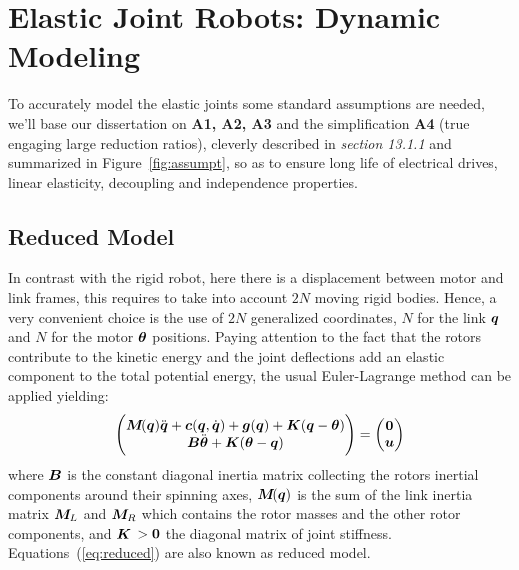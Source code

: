 \section{Elastic Joint Robots: Dynamic Modeling}\label{sec:Dynamic Modeling}
To accurately model the elastic joints some standard assumptions are needed, we'll base our dissertation on \textbf{A1, A2, A3} and the simplification \textbf{A4} (true engaging large reduction ratios), cleverly 
described in \cite{13sic} \textit{section 13.1.1} and summarized in Figure~\ref{fig:assumpt}, so as to ensure long life of electrical drives, linear elasticity, decoupling and independence properties.
\subsection{Reduced Model}
In contrast with the rigid robot, here there is a displacement between motor and link frames, this requires to take into account $2N$ moving rigid bodies. Hence, a very convenient choice is the use of $2N$ generalized coordinates, $N$ for the link ${\boldsymbol{q}}$ and $N$ for the motor $\boldsymbol{\theta}$ positions. Paying attention to the fact that the rotors contribute to the kinetic energy and the joint deflections add an elastic component to the total potential energy, the usual Euler-Lagrange method can be applied 
yielding:
\begin{equation} \label{eq:reduced}
    \begin{pmatrix} 
    \boldsymbol{M}\!({\boldsymbol{q}})\ddot{\boldsymbol{q}}+\boldsymbol{c}({\boldsymbol{q}},\dot{\boldsymbol{q}})+\boldsymbol{g}({\boldsymbol{q}})+\boldsymbol{K}({\boldsymbol{q}}-\boldsymbol{\theta})\\ \boldsymbol{B}\ddot{\boldsymbol{\theta}}+\boldsymbol{K}(\boldsymbol{\theta}-{\boldsymbol{q}}) 
    \end{pmatrix} 
    =
    \begin{pmatrix} \boldsymbol{0} \\ \boldsymbol{u} \end{pmatrix}
\end{equation}
where $\boldsymbol{B}$ is the constant diagonal inertia matrix collecting the rotors inertial components around their spinning axes, $\boldsymbol{M}\!({\boldsymbol{q}})$ is the sum of the link inertia matrix $\boldsymbol{M}_{\!L}$ and $\boldsymbol{M}_{\!R}$ which contains the rotor masses and the other rotor components, and $\boldsymbol{K}$ $>\boldsymbol{0}$ the diagonal matrix of joint stiffness. Equations~(\ref{eq:reduced}) are also known as reduced model.
